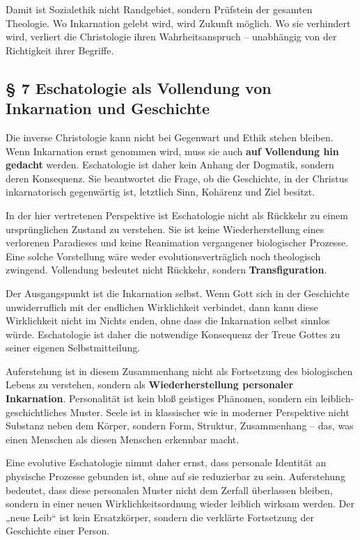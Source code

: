 \documentclass[
]{article}
\begin{document}
Damit ist Sozialethik nicht Randgebiet, sondern Prüfstein der gesamten Theologie. Wo Inkarnation gelebt wird, wird Zukunft möglich. Wo sie verhindert wird, verliert die Christologie ihren Wahrheitsanspruch -- unabhängig von der Richtigkeit ihrer Begriffe.

\subsection{\texorpdfstring{\textbf{§ 7 Eschatologie als Vollendung von Inkarnation und Geschichte}}{§ 7 Eschatologie als Vollendung von Inkarnation und Geschichte}}\label{eschatologie-als-vollendung-von-inkarnation-und-geschichte}

Die inverse Christologie kann nicht bei Gegenwart und Ethik stehen bleiben. Wenn Inkarnation ernst genommen wird, muss sie auch \textbf{auf Vollendung hin gedacht} werden. Eschatologie ist daher kein Anhang der Dogmatik, sondern deren Konsequenz. Sie beantwortet die Frage, ob die Geschichte, in der Christus inkarnatorisch gegenwärtig ist, letztlich Sinn, Kohärenz und Ziel besitzt.

In der hier vertretenen Perspektive ist Eschatologie nicht als Rückkehr zu einem ursprünglichen Zustand zu verstehen. Sie ist keine Wiederherstellung eines verlorenen Paradieses und keine Reanimation vergangener biologischer Prozesse. Eine solche Vorstellung wäre weder evolutionsverträglich noch theologisch zwingend. Vollendung bedeutet nicht Rückkehr, sondern \textbf{Transfiguration}.

Der Ausgangspunkt ist die Inkarnation selbst. Wenn Gott sich in der Geschichte unwiderruflich mit der endlichen Wirklichkeit verbindet, dann kann diese Wirklichkeit nicht im Nichts enden, ohne dass die Inkarnation selbst sinnlos würde. Eschatologie ist daher die notwendige Konsequenz der Treue Gottes zu seiner eigenen Selbstmitteilung.

Auferstehung ist in diesem Zusammenhang nicht als Fortsetzung des biologischen Lebens zu verstehen, sondern als \textbf{Wiederherstellung personaler Inkarnation}. Personalität ist kein bloß geistiges Phänomen, sondern ein leiblich-geschichtliches Muster. Seele ist in klassischer wie in moderner Perspektive nicht Substanz neben dem Körper, sondern Form, Struktur, Zusammenhang -- das, was einen Menschen als diesen Menschen erkennbar macht.

Eine evolutive Eschatologie nimmt daher ernst, dass personale Identität an physische Prozesse gebunden ist, ohne auf sie reduzierbar zu sein. Auferstehung bedeutet, dass diese personalen Muster nicht dem Zerfall überlassen bleiben, sondern in einer neuen Wirklichkeitsordnung wieder leiblich wirksam werden. Der „neue Leib`` ist kein Ersatzkörper, sondern die verklärte Fortsetzung der Geschichte einer Person.
\end{document}
